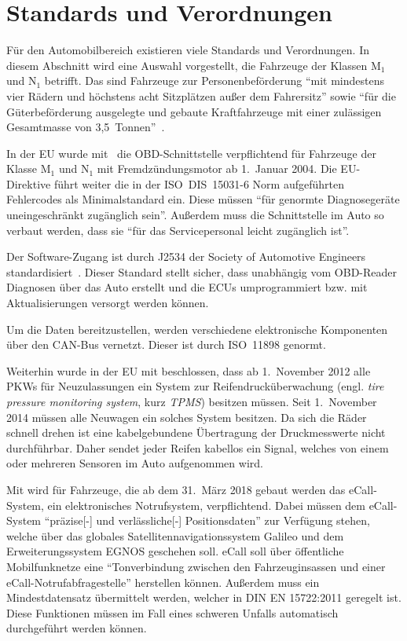 \section{Standards und Verordnungen}\label{ch:standards}
Für den Automobilbereich existieren viele Standards und Verordnungen. In diesem
Abschnitt wird eine Auswahl vorgestellt, die Fahrzeuge der Klassen M$_1$ und
N$_1$ betrifft. Das sind Fahrzeuge zur Personenbeförderung
\enquote{mit mindestens vier Rädern und höchstens acht Sitzplätzen außer dem Fahrersitz}
sowie \enquote{für die Güterbeförderung ausgelegte und gebaute Kraftfahrzeuge
mit einer zulässigen Gesamtmasse von
3,5~Tonnen}~\cite{Richtlinie70/156/EWG:Fahrzeugklassen}.

In der EU wurde mit~\cite{EUDirective98/69/EC} die OBD-Schnittstelle
verpflichtend für Fahrzeuge der Klasse M$_1$ und N$_1$ mit Fremdzündungsmotor
ab 1.~Januar 2004. Die EU-Direktive führt weiter die in der ISO~DIS~15031-6
Norm aufgeführten Fehlercodes als Minimalstandard ein. Diese müssen
\enquote{für genormte Diagnosegeräte \elide uneingeschränkt zugänglich sein}.
Außerdem muss die Schnittstelle im Auto so verbaut werden, dass sie
\enquote{für das Servicepersonal leicht zugänglich \elide ist}.

Der Software-Zugang ist durch J2534 der Society of Automotive Engineers
standardisiert~\cite{SAE2004}. Dieser Standard stellt sicher, dass unabhängig
vom OBD-Reader Diagnosen über das Auto erstellt und die ECUs umprogrammiert
bzw. mit Aktualisierungen versorgt werden können.

Um die Daten bereitzustellen, werden verschiedene elektronische Komponenten
über den CAN-Bus vernetzt. Dieser ist durch ISO~11898 genormt.

Weiterhin wurde in der EU mit \cite{EURegulation661/2009} beschlossen, dass ab
1.~November 2012 alle PKWs für Neuzulassungen ein System zur
Reifen\-druck\-über\-wachung (engl. \textit{tire pressure monitoring system}, kurz
\textit{TPMS}) besitzen müssen. Seit 1.~November 2014 müssen alle Neuwagen ein
solches System besitzen. Da sich die Räder schnell drehen ist eine
kabelgebundene Übertragung der Druckmesswerte nicht durchführbar. Daher sendet
jeder Reifen kabellos ein Signal, welches von einem oder mehreren Sensoren im
Auto aufgenommen wird.

Mit \cite{EURegulation2015/ecall} wird für Fahrzeuge, die ab dem 31.~März 2018
gebaut werden das eCall-System, ein elektronisches Notrufsystem, verpflichtend.
Dabei müssen dem eCall-System \enquote{präzise\mbox{[-]} und verlässliche\mbox{[-]}
Positionsdaten} zur Verfügung stehen, welche über das globales
Satelliten\-navigations\-system Galileo und dem Erweiterungssystem EGNOS geschehen
soll. eCall soll über öffentliche Mobilfunknetze eine \enquote{Tonverbindung
zwischen den Fahrzeug\-insassen und einer eCall-Notruf\-abfrage\-stelle} herstellen
können. Außerdem muss ein Mindestdatensatz übermittelt werden, welcher in
DIN EN 15722:2011 geregelt ist. Diese Funktionen müssen im Fall eines schweren
Unfalls automatisch durchgeführt werden können.

